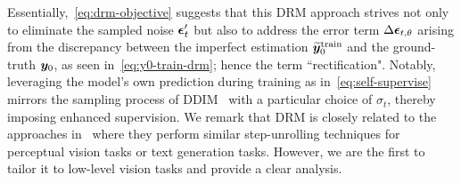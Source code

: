 Essentially,~\cref{eq:drm-objective} suggests that this DRM approach strives not only to eliminate the sampled noise $\bm{{\mathbf{\epsilon}}}'_t$  but also to address the error term $\Delta\bm{{\mathbf{\epsilon}}}_{t,\theta}$ arising from the discrepancy between the imperfect estimation $\widetilde{{\bm{y}}}_0^{\text{train}}$ and the ground-truth ${\bm{y}}_0$, as seen in~\cref{eq:y0-train-drm}; hence the term ``rectification". Notably, leveraging the model's own prediction during training as in~\cref{eq:self-supervise} mirrors the sampling process of DDIM~\cite{song2021denoising} with a particular choice of $\sigma_t$, thereby imposing enhanced supervision. We remark that DRM is closely related to the approaches in~\cite{saxena2023monocular,savinov2022stepunrolled,ji2023ddp} where they perform similar step-unrolling techniques for perceptual vision tasks or text generation tasks. However, we are the first to tailor it to low-level vision tasks and provide a clear analysis.







